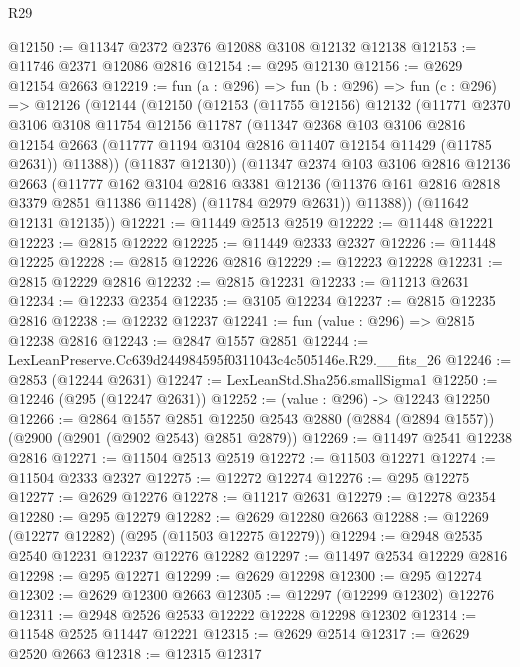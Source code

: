 \begin{lexlean}{R29}
\begin{coremodule}
@12150 := @11347 @2372 @2376 @12088 @3108 @12132 @12138
@12153 := @11746 @2371 @12086 @2816
@12154 := @295 @12130
@12156 := @2629 @12154 @2663
@12219 := fun (a : @296) =>
  fun (b : @296) =>
  fun (c : @296) =>
  @12126
    (@12144
      (@12150
        (@12153
          (@11755 @12156)
          @12132
          (@11771
            @2370
            @3106
            @3108
            @11754
            @12156
            @11787
            (@11347
              @2368
              @103
              @3106
              @2816
              @12154
              @2663
              (@11777 @1194 @3104 @2816 @11407 @12154 @11429 (@11785 @2631))
              @11388))
          (@11837 @12130))
        (@11347
          @2374
          @103
          @3106
          @2816
          @12136
          @2663
          (@11777
            @162
            @3104
            @2816
            @3381
            @12136
            (@11376 @161 @2816 @2818 @3379 @2851 @11386 @11428)
            (@11784 @2979 @2631))
          @11388))
      (@11642 @12131 @12135))
@12221 := @11449 @2513 @2519
@12222 := @11448 @12221
@12223 := @2815 @12222
@12225 := @11449 @2333 @2327
@12226 := @11448 @12225
@12228 := @2815 @12226 @2816
@12229 := @12223 @12228
@12231 := @2815 @12229 @2816
@12232 := @2815 @12231
@12233 := @11213 @2631
@12234 := @12233 @2354
@12235 := @3105 @12234
@12237 := @2815 @12235 @2816
@12238 := @12232 @12237
@12241 := fun (value : @296) => @2815 @12238 @2816
@12243 := @2847 @1557 @2851
@12244 := LexLeanPreserve.Cc639d244984595f0311043c4c505146e.R29.__fits_26
@12246 := @2853 (@12244 @2631)
@12247 := LexLeanStd.Sha256.smallSigma1
@12250 := @12246 (@295 (@12247 @2631))
@12252 := (value : @296) -> @12243 @12250
@12266 := @2864
    @1557
    @2851
    @12250
    @2543
    @2880
    (@2884 (@2894 @1557))
    (@2900 (@2901 (@2902 @2543) @2851 @2879))
@12269 := @11497 @2541 @12238 @2816
@12271 := @11504 @2513 @2519
@12272 := @11503 @12271
@12274 := @11504 @2333 @2327
@12275 := @12272 @12274
@12276 := @295 @12275
@12277 := @2629 @12276
@12278 := @11217 @2631
@12279 := @12278 @2354
@12280 := @295 @12279
@12282 := @2629 @12280 @2663
@12288 := @12269 (@12277 @12282) (@295 (@11503 @12275 @12279))
@12294 := @2948 @2535 @2540 @12231 @12237 @12276 @12282
@12297 := @11497 @2534 @12229 @2816
@12298 := @295 @12271
@12299 := @2629 @12298
@12300 := @295 @12274
@12302 := @2629 @12300 @2663
@12305 := @12297 (@12299 @12302) @12276
@12311 := @2948 @2526 @2533 @12222 @12228 @12298 @12302
@12314 := @11548 @2525 @11447 @12221
@12315 := @2629 @2514
@12317 := @2629 @2520 @2663
@12318 := @12315 @12317

\end{coremodule}
\end{lexlean}
